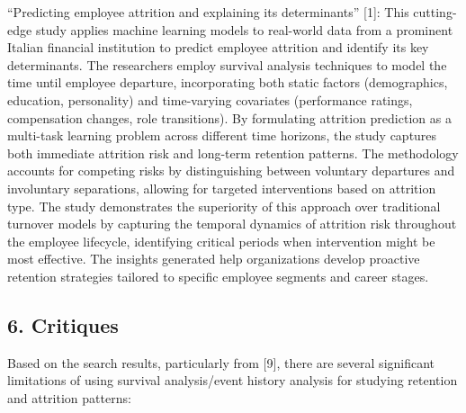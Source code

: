 \documentclass[
  letterpaper,
  DIV=11,
  numbers=noendperiod]{scrartcl}
\begin{document}
``Predicting employee attrition and explaining its determinants''
{[}1{]}: This cutting-edge study applies machine learning models to
real-world data from a prominent Italian financial institution to
predict employee attrition and identify its key determinants. The
researchers employ survival analysis techniques to model the time until
employee departure, incorporating both static factors (demographics,
education, personality) and time-varying covariates (performance
ratings, compensation changes, role transitions). By formulating
attrition prediction as a multi-task learning problem across different
time horizons, the study captures both immediate attrition risk and
long-term retention patterns. The methodology accounts for competing
risks by distinguishing between voluntary departures and involuntary
separations, allowing for targeted interventions based on attrition
type. The study demonstrates the superiority of this approach over
traditional turnover models by capturing the temporal dynamics of
attrition risk throughout the employee lifecycle, identifying critical
periods when intervention might be most effective. The insights
generated help organizations develop proactive retention strategies
tailored to specific employee segments and career stages.

\subsection{6. Critiques}\label{critiques}

Based on the search results, particularly from {[}9{]}, there are
several significant limitations of using survival analysis/event history
analysis for studying retention and attrition patterns:
\end{document}
